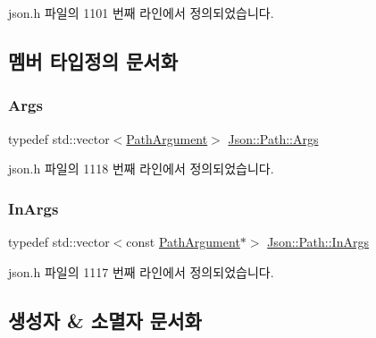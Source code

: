 json.\+h 파일의 1101 번째 라인에서 정의되었습니다.



\subsection{멤버 타입정의 문서화}
\mbox{\label{class_json_1_1_path_a27d96232d034d7a78286468676f9cb3e}} 
\subsubsection{\texorpdfstring{Args}{Args}}
{\footnotesize\ttfamily typedef std\+::vector$<$\hyperlink{class_json_1_1_path_argument}{Path\+Argument}$>$ \hyperlink{class_json_1_1_path_a27d96232d034d7a78286468676f9cb3e}{Json\+::\+Path\+::\+Args}\hspace{0.3cm}{\ttfamily [private]}}



json.\+h 파일의 1118 번째 라인에서 정의되었습니다.

\mbox{\label{class_json_1_1_path_ab29d7b2fc896c7d3c5ed4609af3a3f23}} 
\subsubsection{\texorpdfstring{In\+Args}{InArgs}}
{\footnotesize\ttfamily typedef std\+::vector$<$const \hyperlink{class_json_1_1_path_argument}{Path\+Argument}$\ast$$>$ \hyperlink{class_json_1_1_path_ab29d7b2fc896c7d3c5ed4609af3a3f23}{Json\+::\+Path\+::\+In\+Args}\hspace{0.3cm}{\ttfamily [private]}}



json.\+h 파일의 1117 번째 라인에서 정의되었습니다.



\subsection{생성자 \& 소멸자 문서화}
\mbox{\label{class_json_1_1_path_a7356c0e9c1fc2276390fd396271c1300}} 
